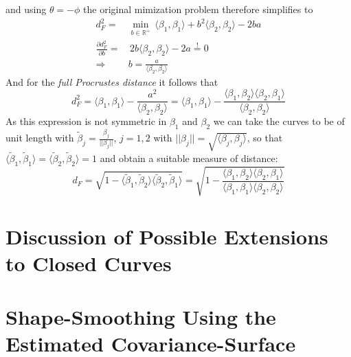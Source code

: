 and using $\theta = -\phi$ the original mimization problem therefore simplifies to
\begin{align*}
    d_F^2 =&
    \min_{b \in \mathbb{R}^+}\,
    \langle \beta_1, \beta_1 \rangle
    + b^2 \langle \beta_2, \beta_2 \rangle
    - 2 b a \\
    \frac{\partial d_F^2}{\partial b} =& \,
    2 b \langle \beta_2, \beta_2 \rangle - 2a \stackrel{!}{=} 0 \\
    \Rightarrow \quad & b = \frac{a}{\langle \beta_2, \beta_2 \rangle}
\end{align*}
And for the \textit{full Procrustes distance} it follows that
$$ d_F^2
= \langle \beta_1, \beta_1 \rangle - \frac{a^2}{\langle \beta_2, \beta_2 \rangle}
= \langle \beta_1, \beta_1 \rangle - \frac{ \langle \beta_1, \beta_2 \rangle \langle \beta_2, \beta_1 \rangle}{\langle \beta_2, \beta_2 \rangle}$$
As this expression is not symmetric in $\beta_1$ and $\beta_2$ we can take the curves to be of unit length with $\tilde{\beta}_j = \frac{\beta_j}{||\beta_j||}$, $j=1,2$ with $||\beta_j|| = \sqrt{\langle \beta_j, \beta_j \rangle}$, so that $\langle \tilde\beta_1, \tilde\beta_1 \rangle = \langle \tilde\beta_2, \tilde\beta_2 \rangle = 1$ and obtain a suitable measure of distance:
$$ d_F = \sqrt{1 - \langle \tilde\beta_1, \tilde\beta_2 \rangle
\langle \tilde\beta_2, \tilde\beta_1 \rangle}
= \sqrt{1 - \frac{ \langle \beta_1, \beta_2 \rangle \langle \beta_2, \beta_1 \rangle}{\langle \beta_1, \beta_1 \rangle \langle \beta_2, \beta_2 \rangle}}$$


\section{Discussion of Possible Extensions to Closed Curves}

\section{Shape-Smoothing Using the Estimated Covariance-Surface}
